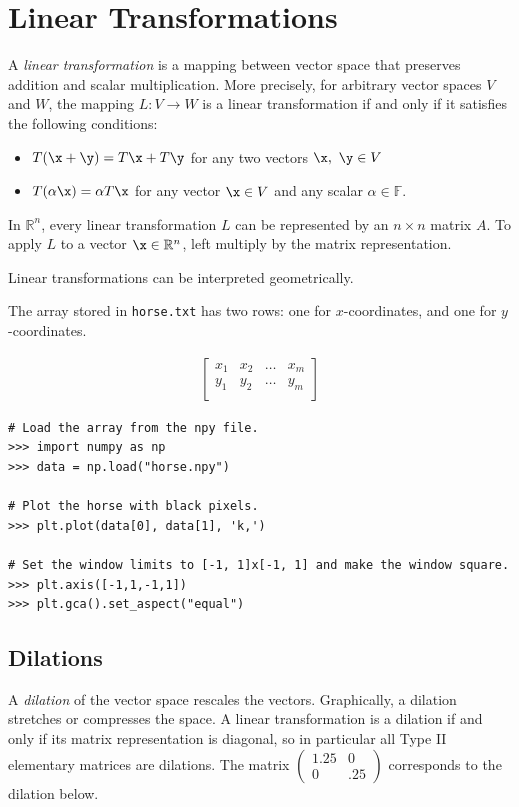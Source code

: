 \section*{Linear Transformations} %

A \emph{linear transformation} is a mapping between vector space that preserves addition and scalar multiplication.
More precisely, for arbitrary vector spaces $V$ and $W$, the mapping $L:V\rightarrow W$ is a linear transformation if and only if it satisfies the following conditions:
%
\begin{itemize}
\item $T(\x + \y) = T\x + T\y$ for any two vectors $\x,\ \y \in V$
\item $T(\alpha\x) = \alpha T\x$ for any vector $\x \in V$ and any scalar $\alpha \in \mathbb{F}$.
\end{itemize}

In $\mathbb{R}^n$, every linear transformation $L$ can be represented by an $n \times n$ matrix $A$.
To apply $L$ to a vector $\x \in \mathbb{R}^n$, left multiply by the matrix representation.

Linear transformations can be interpreted geometrically.

The array stored in \texttt{horse.txt} has two rows: one for $x$-coordinates, and one for $y$-coordinates.

\begin{align*}
\left[\begin{array}{cccc}
x_1 & x_2 & \ldots & x_m \\
y_1 & y_2 & \ldots & y_m \\
\end{array}\right]
\end{align*}

\begin{lstlisting}
# Load the array from the npy file.
>>> import numpy as np
>>> data = np.load("horse.npy")

# Plot the horse with black pixels.
>>> plt.plot(data[0], data[1], 'k,')

# Set the window limits to [-1, 1]x[-1, 1] and make the window square.
>>> plt.axis([-1,1,-1,1])
>>> plt.gca().set_aspect("equal")
\end{lstlisting}

\subsection*{Dilations}
A \emph{dilation} of the vector space rescales the vectors.
Graphically, a dilation stretches or compresses the space.
A linear transformation is a dilation if and only if its matrix representation is diagonal, so in particular all Type II elementary matrices are dilations.
The matrix $\begin{pmatrix}1.25 & 0\\0 & .25 \end{pmatrix}$ corresponds to the dilation below.

